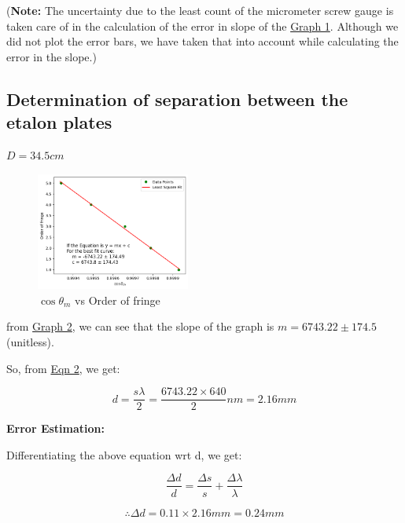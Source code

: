         (\textbf{Note:} The uncertainty due to the least count of the micrometer screw gauge is taken care of in the calculation of the error in slope of the \hyperref[graph:1]{Graph 1}. Although we did not plot the error bars, we have taken that into account while calculating the error in the slope.)

    \subsection{Determination of separation between the etalon plates}

        $D = 34.5cm$

        

		\begin{figure}[H]
			\centering
			\includegraphics[width=0.45\textwidth]{images/graph_2.png}
			\caption{$\cos\theta_m$ vs Order of fringe}
			\label{graph:2}
		\end{figure}

        from \hyperref[graph:2]{Graph 2}, we can see that the slope of the graph is $m = 6743.22\pm174.5$ (unitless).

        So, from \hyperref[eqn:2]{Eqn 2}, we get:
        
        $$d = \frac{s\lambda}{2} = \frac{6743.22\times640}{2}nm = 2.16mm$$

        \textbf{Error Estimation:} 

        Differentiating the above equation wrt d, we get:

        $$\frac{\Delta d}{d} = \frac{\Delta s}{s} + \frac{\Delta\lambda}{\lambda}$$

        $$\therefore \Delta d = 0.11\times2.16 mm = 0.24mm$$

        \begin{center}
        \end{center}
